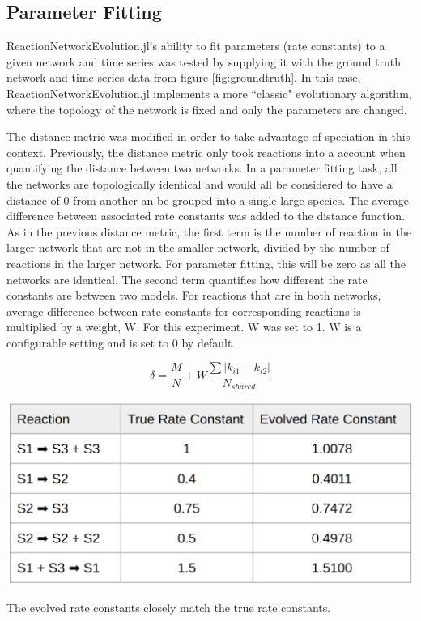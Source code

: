 \documentclass[12pt]{report}
\begin{document}
\subsection{Parameter Fitting}
ReactionNetworkEvolution.jl's ability to fit parameters (rate constants) to a given network and time series was tested by supplying it with the ground truth network and time series data from figure \ref{fig:groundtruth}. In this case, ReactionNetworkEvolution.jl implements a more ``classic" evolutionary algorithm, where the topology of the network is fixed and only the parameters are changed. 

The distance metric was modified in order to take advantage of speciation in this context. Previously, the distance metric only took reactions into a account when quantifying the distance between two networks. In a parameter fitting task, all the networks are topologically identical and would all be considered to have a distance of 0 from another an be grouped into a single large species. The average difference  between associated rate constants was added to the distance function. As in the previous distance metric, the first term is the number of reaction in the larger network that are not in the smaller network, divided by the number of reactions in the larger network. For parameter fitting, this will be zero as all the networks are identical. The second term quantifies how different the rate constants are between two models. For reactions that are in both networks, average difference between rate constants for corresponding reactions is multiplied by a weight, W. For this experiment. W was set to 1. W is a configurable setting and is set to 0 by default.


\begin{equation}
\delta=\frac{M}{N} + W\frac{\sum|k_{i1} - k_{i2}|}{N_{shared}}
\end{equation}

\begin{table}
\centering
    \includegraphics[width=15cm]{images/parameterfit.png}
    \caption[Parameter fitting results]{The evolved rate constants closely match the true rate constants.}
    \label{table:parameterfit}
\end{table}
\end{document}
